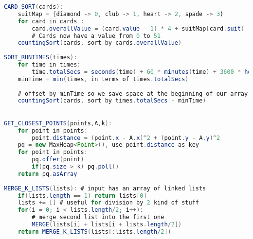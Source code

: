 \documentclass{article}
\begin{document}
\clearpage

\begin{lstlisting}[language=Java]
CARD_SORT(cards):
    suitMap = {diamond -> 0, club -> 1, heart -> 2, spade -> 3)
    for card in cards :
        card.overallValue = (card.value - 1) * 4 + suitMap[card.suit]
        # Cards now have a value from 0 to 51
    countingSort(cards, sort by cards.overallValue)
    
SORT_RUNTIMES(times):
    for time in times:
        time.totalSecs = seconds(time) + 60 * minutes(time) + 3600 * hours(time)
    minTime = min(times, in terms of times.totalSecs)
    
    # offset by minTime so we save space at the beginning of our array
    countingSort(cards, sort by times.totalSecs - minTime)

    
GET_CLOSEST_POINTS(points,A,k):
    for point in points:
        point.distance = (point.x - A.x)^2 + (point.y - A.y)^2
    pq = new MaxHeap<Point>(), use point.distance as key
    for point in points:
        pq.offer(point)
        if(pq.size > k) pq.poll()
    return pq.asArray
    
MERGE_K_LISTS(lists): # input has an array of linked lists
    if(lists.length == 1) return lists[0]
    lists += [] # useful for division by 2 kind of stuff
    for(i = 0; i < lists.length/2; i++):
        # merge second list into the first one
        MERGE(lists[i] + lists[i + lists.length/2])
    return MERGE_K_LISTS(lists[:lists.length/2])

\end{lstlisting}

    
    
    
    
    
\end{document}
